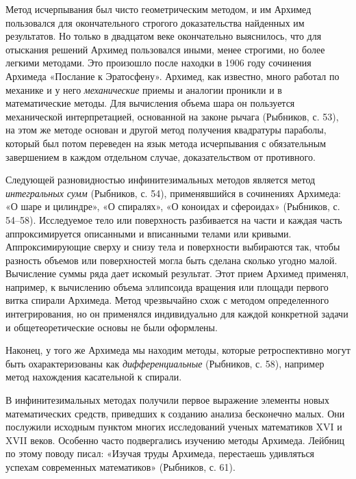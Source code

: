 Метод  исчерпывания был  чисто  геометрическим методом,  и им  Архимед
пользовался  для окончательного  строгого доказательства  найденных им
результатов. Но  только в двадцатом веке  окончательно выяснилось, что
для отыскания  решений Архимед  пользовался иными, менее  строгими, но
более  легкими  методами. Это  произошло  после  находки в  1906  году
сочинения  Архимеда «Послание  к Эратосфену».  Архимед, как  известно,
много  работал  по механике  и  у  него \emph{механические}  приемы  и
аналогии  проникли и  в математические  методы. Для  вычисления объема
шара он  пользуется механической интерпретацией, основанной  на законе
рычага (Рыбников,  с. 53), на  этом же  методе основан и  другой метод
получения  квадратуры параболы,  который был  потом переведен  на язык
метода  исчерпывания с  обязательным  завершением  в каждом  отдельном
случае, доказательством от противного.

Следующей  разновидностью  инфинитезимальных  методов  является  метод
\emph{интегральных сумм} (Рыбников, с. 54), применявшийся в сочинениях
Архимеда: «О шаре и цилиндре»,  «О спиралях», «О коноидах и сфероидах»
(Рыбников, с. 54--58). Исследуемое тело или поверхность разбивается на
части и  каждая часть аппроксимируется описанными  и вписанными телами
или  кривыми.  Аппроксимирующие  сверху  и снизу  тела  и  поверхности
выбираются  так, чтобы  разность объемов  или поверхностей  могла быть
сделана  сколько  угодно малой.  Вычисление  суммы  ряда дает  искомый
результат. Этот прием Архимед  применял, например, к вычислению объема
эллипсоида  вращения  или  площади  первого  витка  спирали  Архимеда.
Метод  чрезвычайно   схож  с  методом   определенного  интегрирования,
но  он  применялся  индивидуально   для  каждой  конкретной  задачи  и
общетеоретические основы не были оформлены.

Наконец, у того же Архимеда  мы находим методы, которые ретроспективно
могут быть охарактеризованы  как \emph{дифференциальные} (Рыбников, с.
58), например метод нахождения касательной к спирали.

В инфинитезимальных  методах получили первое выражение  элементы новых
математических средств, приведших к созданию анализа бесконечно малых.
Они послужили исходным пунктом  многих исследований ученых математиков
XVI  и  XVII  веков.   Особенно  часто  подвергались  изучению  методы
Архимеда.  Лейбниц  по этому  поводу  писал:  «Изучая труды  Архимеда,
перестаешь удивляться  успехам современных математиков»  (Рыбников, с.
61).


